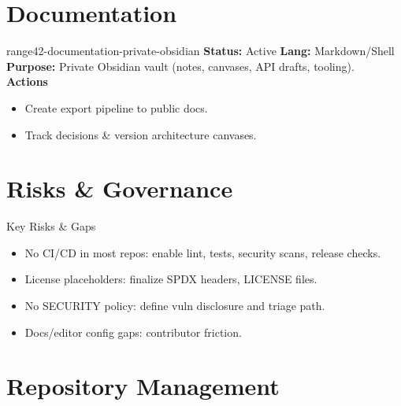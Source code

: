 \documentclass[aspectratio=169]{beamer}
\begin{document}
\section{Documentation}

\begin{frame}{range42-documentation-private-obsidian \; \faBook}
  \textbf{Status:} Active \hfill \textbf{Lang:} Markdown/Shell\\[2mm]
  \textbf{Purpose:} Private Obsidian vault (notes, canvases, API drafts, tooling).\\[2mm]
  \textbf{Actions}
  \begin{itemize}
    \item Create export pipeline to public docs.
    \item Track decisions \& version architecture canvases.
  \end{itemize}
\end{frame}

\section{Risks \& Governance}

\begin{frame}{Key Risks \& Gaps \; \faExclamationTriangle}
  \begin{itemize}
    \item \alert{No CI/CD in most repos}: enable lint, tests, security scans, release checks.
    \item \alert{License placeholders}: finalize SPDX headers, LICENSE files.
    \item \alert{No SECURITY policy}: define vuln disclosure and triage path.
    \item Docs/editor config gaps: contributor friction.
  \end{itemize}
\end{frame}


\section{Repository Management}
\end{document}
